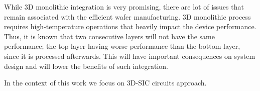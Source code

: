 While 3D monolithic integration is very promising, there are lot of issues that remain associated with the efficient wafer manufacturing. 3D monolithic process requires high-temperature operations that heavily impact the device performance. Thus, it is known that two consecutive layers will not have the same performance; the top layer having worse performance than the bottom layer, since it is processed afterwards. This will have important consequences on system design and will lower the benefits of such integration.

In the context of this work we focus on 3D-SIC circuits approach.